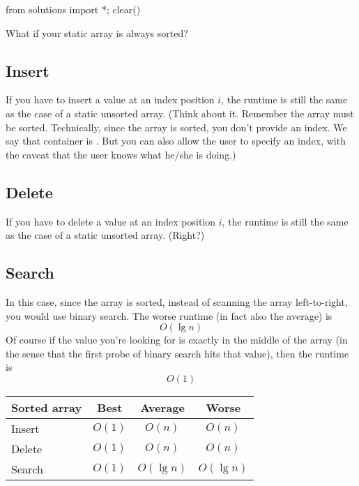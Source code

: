 \begin{python0}
from solutions import *; clear()
\end{python0}

What if your static array is always sorted?

\subsection{Insert}

If you have to insert a value at an index position $i$,
the runtime is still the same as the case of a static unsorted array.
(Think about it. Remember the array must be sorted.
Technically, since the array is sorted, you don't provide an
index. We say that container is .
But you can also allow the user to specify an index,
with the caveat that the user knows what he/she is doing.)

\subsection{Delete}

If you have to delete a value at an index position $i$,
the runtime is still the same as the case of a static unsorted array.
(Right?)

\subsection{Search}

In this case, since the array is sorted, instead of scanning the
array left-to-right, you would use binary search.
The worse runtime (in fact also the average) is
\[
O(\lg n)
\]
Of course if the value you're looking for is exactly in the middle of the
array (in the sense that the first probe of binary search hits that value),
then the runtime is
\[
O(1)
\]
\begin{longtable}{|l|c|c|c|}
\hline
Sorted array & Best   & Average      & Worse  \\* 
\hline\hline
Insert       & $O(1)$ & $O(n)$       & $O(n)$ \\*
Delete       & $O(1)$ & $O(n)$       & $O(n)$ \\*
Search       & $O(1)$ & $O(\lg n)$ & $O(\lg n)$ \\* 
\hline
\end{longtable}


